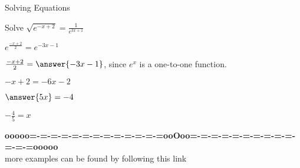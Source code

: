 \documentclass{ximera}
\begin{document}
\begin{example} Solving Equations


Solve $\sqrt{e^{-x + 2}} = \frac{1}{e^{3x+1}}$


\begin{explanation}

$e^{\tfrac{-x + 2}{2}}= e^{-3x-1}$


$\frac{-x + 2}{2} = \answer{-3x-1}$, since $e^x$ is a one-to-one function.

$-x + 2 = -6x - 2$

$\answer{5x} = -4$


$-\frac{4}{5} = x$
\end{explanation}
\end{example}











\begin{center}
\textbf{\textcolor{green!50!black}{ooooo=-=-=-=-=-=-=-=-=-=-=-=-=ooOoo=-=-=-=-=-=-=-=-=-=-=-=-=ooooo}} \\

more examples can be found by following this link\\ 

\end{center}
\end{document}
